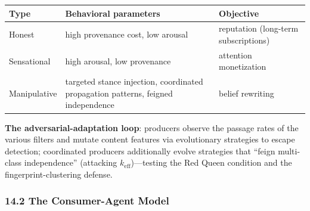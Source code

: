 \documentclass[
  11pt]{article}
\begin{document}
\begin{longtable}[]{@{}
  >{\raggedright\arraybackslash}p{}
  >{\raggedright\arraybackslash}p{}
  >{\raggedright\arraybackslash}p{}@{}}
\toprule\noalign{}
\begin{minipage}[b]{\linewidth}\raggedright
Type
\end{minipage} & \begin{minipage}[b]{\linewidth}\raggedright
Behavioral parameters
\end{minipage} & \begin{minipage}[b]{\linewidth}\raggedright
Objective
\end{minipage} \\
\midrule\noalign{}
\endhead
\bottomrule\noalign{}
\endlastfoot
Honest & high provenance cost, low arousal & reputation (long-term
subscriptions) \\
Sensational & high arousal, low provenance & attention monetization \\
Manipulative & targeted stance injection, coordinated propagation
patterns, feigned independence & belief rewriting \\
\end{longtable}

\textbf{The adversarial-adaptation loop}: producers observe the passage
rates of the various filters and mutate content features via
evolutionary strategies to escape detection; coordinated producers
additionally evolve strategies that ``feign multi-class independence''
(attacking \(k_{\mathrm{eff}}\))---testing the Red Queen condition and
the fingerprint-clustering defense.

\subsubsection{14.2 The Consumer-Agent
Model}\label{the-consumer-agent-model}
\end{document}
